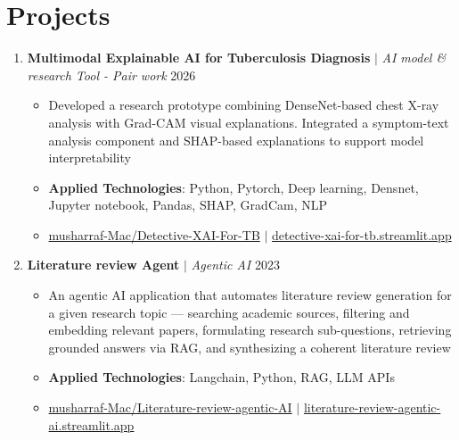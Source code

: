 \documentclass[10pt,a4paper]{article}
\newcommand{\project}[3]{%
  \textbf{#1} $|$ \textit{#2} \hfill #3}
\begin{document}
\section{Projects}

\begin{enumerate}
  \item \project{Multimodal Explainable AI for Tuberculosis Diagnosis}{AI model \& research Tool - Pair work}{2026}
   \begin{itemize}
    \item Developed a research prototype combining DenseNet-based chest X-ray analysis with Grad-CAM visual explanations. Integrated a symptom-text analysis component and SHAP-based explanations to support model interpretability
    \item \textbf{Applied Technologies}: Python, Pytorch, Deep learning, Densnet, Jupyter notebook, Pandas, SHAP, GradCam, NLP
    \item \faGithub \href{https://github.com/musharraf-Mac/Detective-XAI-For-TB}{ musharraf-Mac/Detective-XAI-For-TB} \hspace{0.15cm} $|$ \hspace{0.15cm} \faLink \href{https://detective-xai-for-tb.streamlit.app}{ detective-xai-for-tb.streamlit.app}
   \end{itemize}


  \item \project{Literature review Agent}{Agentic AI}{2023}
   \begin{itemize}
    \item An agentic AI application that automates literature review generation for a given research topic — searching academic sources, filtering and embedding relevant papers, formulating research sub-questions, retrieving grounded answers via RAG, and synthesizing a coherent literature review
    \item \textbf{Applied Technologies}: Langchain, Python, RAG, LLM APIs
    \item \faGithub \href{https://github.com/musharraf-Mac/Literature-review-agentic-AI}{ musharraf-Mac/Literature-review-agentic-AI} \hspace{0.2cm} $|$ \hspace{0.2cm} \faLink \href{https://literature-review-agentic-ai.streamlit.app/}{ literature-review-agentic-ai.streamlit.app}
   \end{itemize}
  


\end{enumerate}
\end{document}
